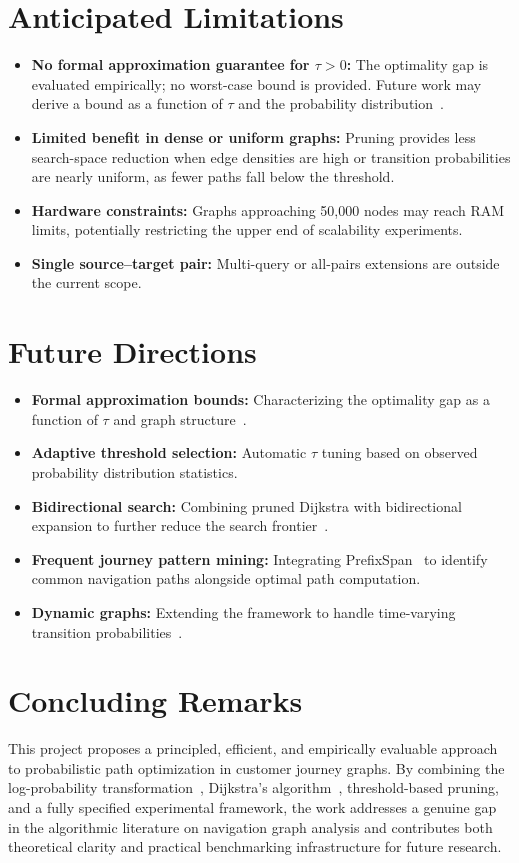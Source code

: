 \section{Anticipated Limitations}

\begin{itemize}
    \item \textbf{No formal approximation guarantee for $\tau > 0$:} The optimality gap is evaluated empirically; no worst-case bound is provided. Future work may derive a bound as a function of $\tau$ and the probability distribution~\citep{cormen2009}.
    \item \textbf{Limited benefit in dense or uniform graphs:} Pruning provides less search-space reduction when edge densities are high or transition probabilities are nearly uniform, as fewer paths fall below the threshold.
    \item \textbf{Hardware constraints:} Graphs approaching 50,000 nodes may reach RAM limits, potentially restricting the upper end of scalability experiments.
    \item \textbf{Single source--target pair:} Multi-query or all-pairs extensions are outside the current scope.
\end{itemize}

\section{Future Directions}

\begin{itemize}
    \item \textbf{Formal approximation bounds:} Characterizing the optimality gap as a function of $\tau$ and graph structure~\citep{cormen2009}.
    \item \textbf{Adaptive threshold selection:} Automatic $\tau$ tuning based on observed probability distribution statistics.
    \item \textbf{Bidirectional search:} Combining pruned Dijkstra with bidirectional expansion to further reduce the search frontier~\citep{cormen2009}.
    \item \textbf{Frequent journey pattern mining:} Integrating PrefixSpan~\citep{pei2001prefixspan} to identify common navigation paths alongside optimal path computation.
    \item \textbf{Dynamic graphs:} Extending the framework to handle time-varying transition probabilities~\citep{norris1998markov}.
\end{itemize}

\section{Concluding Remarks}

This project proposes a principled, efficient, and empirically evaluable approach to probabilistic path optimization in customer journey graphs. By combining the log-probability transformation~\citep{viterbi1967error}, Dijkstra's algorithm~\citep{dijkstra1959}, threshold-based pruning, and a fully specified experimental framework, the work addresses a genuine gap in the algorithmic literature on navigation graph analysis and contributes both theoretical clarity and practical benchmarking infrastructure for future research.

